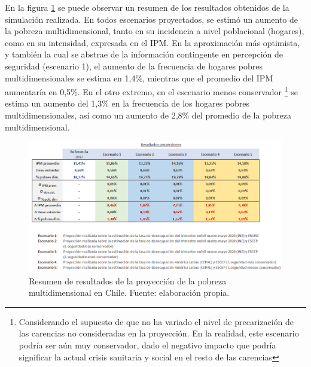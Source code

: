 \documentclass[12pt,letterpaper,spanish]{article}
\begin{document}
En la figura \ref{resumen_resultados_escenarios} se puede observar un resumen de los resultados obtenidos de la simulación realizada. En todos escenarios proyectados, se estimó un aumento de la pobreza multidimensional, tanto en su incidencia a nivel poblacional (hogares), como en su intensidad, expresada en el IPM. En la aproximación más optimista, y también la cual se abstrae de la información contingente en percepción de seguridad (escenario 1), el aumento de la frecuencia de hogares pobres multidimensionales se estima en 1,4\%, mientras que el promedio del IPM aumentaría en 0,5\%.  En el otro extremo, en el escenario menos conservador \footnote{Considerando el supuesto de que no ha variado el nivel de precarización de las carencias no consideradas en la proyección. En la realidad, este escenario podría ser aún muy conservador, dado el negativo impacto que podría significar la actual crisis sanitaria y social en el resto de las carencias} se estima un aumento del 1,3\% en la frecuencia de los hogares pobres multidimensionales, así como un aumento de 2,8\% del promedio de la pobreza multidimensional.






\begin{figure}[H]
    \centering
    \includegraphics[width=\textwidth]{Max/resultados_escenarios.png}
    \caption{Resumen de resultados de la proyección de la pobreza multidimensional en Chile. Fuente: elaboración propia.}
    \label{resumen_resultados_escenarios}
\end{figure}
\end{document}
